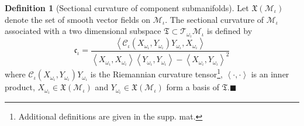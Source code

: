\documentclass[10pt,journal,compsoc]{IEEEtran}
\newcommand{\Mi}{\mathcal{M}_{\iota}}
\newcommand{\Ci}{\mathcal{C}_{\iota}}
\newcommand{\Oi}{\omega_{\iota}}
\theoremstyle{definition}
\newtheorem{definition}[theorem]{Definition}
\theoremstyle{definition}
\theoremstyle{remark}
\theoremstyle{remark}
\theoremstyle{remark}
\newcommand*{\QEDbs}{\hfill\ensuremath{\blacksquare}}%
\begin{document}
\begin{definition}[Sectional curvature of component submanifolds]
	Let $\mathfrak{X}(\Mi)$ denote the set of smooth vector fields on $\Mi$. The sectional curvature of $\Mi$ associated with a two dimensional subspace $\mathfrak{T} \subset \mathcal{T}_{\Oi}\Mi$  is defined by 
	\begin{equation}
	\mathfrak{c}_{\iota} = \frac{\left\langle \Ci(X_{\Oi},Y_{\Oi})Y_{\Oi},X_{\Oi}  \right\rangle}{\left\langle  X_{\Oi} , X_{\Oi} \right\rangle \left\langle  Y_{\Oi} , Y_{\Oi} \right\rangle  -   \left\langle X_{\Oi} ,Y_{\Oi} \right\rangle^2}
	\end{equation}
	where $\Ci(X_{\Oi},Y_{\Oi})Y_{\Oi}$ is the Riemannian curvature tensor\footnote{Additional definitions are given in the supp. mat.}, $\left\langle \cdot,\cdot \right\rangle$ is an inner product, ${X_{\Oi} \in \mathfrak{X}(\Mi)}$ and ${Y_{\Oi} \in \mathfrak{X}(\Mi)}$ form a basis of $\mathfrak{T}$.\QEDbs	
\end{definition}
\end{document}
